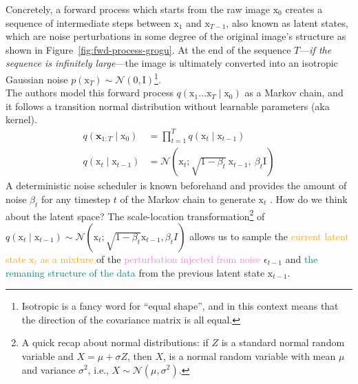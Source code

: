\noindent Concretely, a forward process which starts from the raw image $\mathrm{x}_{0}$ creates a sequence of intermediate steps between $\mathrm{x}_{1}$ and $\mathrm{x}_{T-1}$, also known as latent states, which are noise perturbations in some degree of the original image's structure as shown in Figure~\ref{fig:fwd-process-grogu}. At the end of the sequence $T$---\textit{if the sequence is infinitely large}---the image is ultimately converted into an isotropic Gaussian noise $p(\mathrm{x}_{T})\sim \mathcal{N}(\mathrm{0}, \mathrm{I})$\footnote{Isotropic is a fancy word for ``equal shape'', and in this context means that the direction of the covariance matrix is all equal.}.\\

\noindent The authors model this forward process $q(\mathrm{x}_{1}\dots\mathrm{x}_{T}\mid\mathrm{x}_{0})$ as a Markov chain, and it follows a transition normal distribution without learnable parameters (aka kernel). 
\begin{align}\label{eqn:forward-process}
q(\mathbf{x}_{1:T}\mid\mathrm{x}_0) &= \prod_{t=1}^{T}q(\mathrm{x}_t\mid\mathrm{x}_{t-1})
\\
q(\mathrm{x}_t\mid\mathrm{x}_{t-1}) &= \mathcal{N}(\mathrm{x}_t;\sqrt{1-\beta_{t}}~\mathrm{x}_{t-1},~ \beta_{t}\mathrm{I})
\end{align}
A deterministic noise scheduler is known beforehand and provides the
amount of noise $\beta_{t}$ for any timestep $t$ of the Markov chain to
generate $\mathrm{x}_{t}$ . How do we think about the latent space? The scale-location transformation\footnote{A quick recap about normal distributions: if $Z$ is a standard normal random variable and $X=\mu + \sigma Z$, then $X$, is a normal random variable with mean $\mu$ and variance $\sigma^2$, i.e., $X\sim\mathcal{N}(\mu, \sigma^2)$.} of $q(\mathrm{x}_{t}\mid\mathrm{x}_{t-1})\sim\mathcal{N}(\mathrm{x}_{t}; \sqrt{1-\beta_{t}} \mathrm{x}_{t-1}, \beta_{t}I)$ allows us to sample the \textcolor{orange}{current latent state $\mathrm{x}_{t}$ as a mixture} of the 
\textcolor{violet}{perturbation injected from noise} $\epsilon_{t-1}$ and \textcolor{teal}{the remaning structure
of the data} from the previous latent state $\mathrm{x}_{t-1}$.

